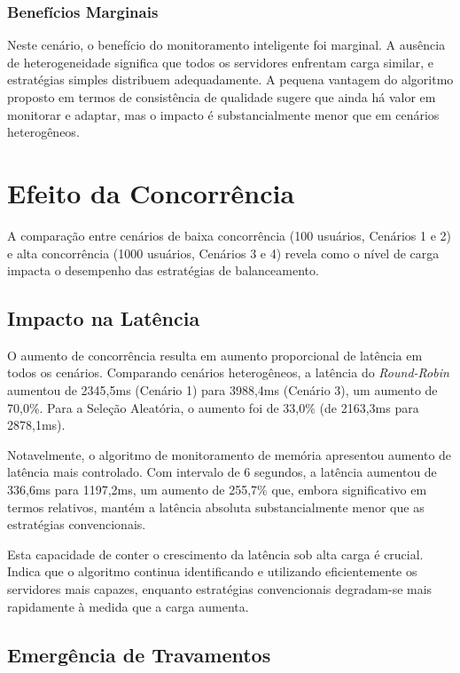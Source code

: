 \subsubsection{Benefícios Marginais}

Neste cenário, o benefício do monitoramento inteligente foi marginal. A ausência de heterogeneidade significa que todos os servidores enfrentam carga similar, e estratégias simples distribuem adequadamente. A pequena vantagem do algoritmo proposto em termos de consistência de qualidade sugere que ainda há valor em monitorar e adaptar, mas o impacto é substancialmente menor que em cenários heterogêneos.

\section{Efeito da Concorrência}

A comparação entre cenários de baixa concorrência (100 usuários, Cenários 1 e 2) e alta concorrência (1000 usuários, Cenários 3 e 4) revela como o nível de carga impacta o desempenho das estratégias de balanceamento.

\subsection{Impacto na Latência}

O aumento de concorrência resulta em aumento proporcional de latência em todos os cenários. Comparando cenários heterogêneos, a latência do \textit{Round-Robin} aumentou de 2345,5ms (Cenário 1) para 3988,4ms (Cenário 3), um aumento de 70,0\%. Para a Seleção Aleatória, o aumento foi de 33,0\% (de 2163,3ms para 2878,1ms).

Notavelmente, o algoritmo de monitoramento de memória apresentou aumento de latência mais controlado. Com intervalo de 6 segundos, a latência aumentou de 336,6ms para 1197,2ms, um aumento de 255,7\% que, embora significativo em termos relativos, mantém a latência absoluta substancialmente menor que as estratégias convencionais.

Esta capacidade de conter o crescimento da latência sob alta carga é crucial. Indica que o algoritmo continua identificando e utilizando eficientemente os servidores mais capazes, enquanto estratégias convencionais degradam-se mais rapidamente à medida que a carga aumenta.

\subsection{Emergência de Travamentos}

